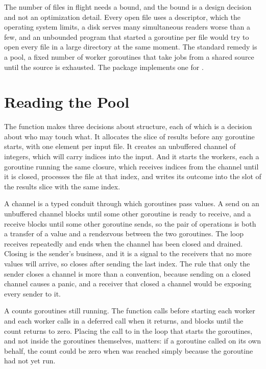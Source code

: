 The number of files in flight needs a bound, and the bound is a design decision and not an optimization detail. Every open file uses a descriptor, which the operating system limits, a disk serves many simultaneous readers worse than a few, and an unbounded program that started a goroutine per file would try to open every file in a large directory at the same moment. The standard remedy is a pool, a fixed number of worker goroutines that take jobs from a shared source until the source is exhausted. The package  implements one for \golab{}.


\section{Reading the Pool}

The function  makes three decisions about structure, each of which is a decision about who may touch what. It allocates the slice of results before any goroutine starts, with one element per input file. It creates an unbuffered channel  of integers, which will carry indices into the input. And it starts the workers, each a goroutine running the same closure, which receives indices from the channel until it is closed, processes the file at that index, and writes its outcome into the slot of the results slice with the same index.

A channel is a typed conduit through which goroutines pass values. A send on an unbuffered channel blocks until some other goroutine is ready to receive, and a receive blocks until some other goroutine sends, so the pair of operations is both a transfer of a value and a rendezvous between the two goroutines. The loop  receives repeatedly and ends when the channel has been closed and drained. Closing is the sender's business, and it is a signal to the receivers that no more values will arrive, so  closes  after sending the last index. The rule that only the sender closes a channel is more than a convention, because sending on a closed channel causes a panic, and a receiver that closed a channel would be exposing every sender to it.

A  counts goroutines still running. The function calls  before starting each worker and each worker calls  in a deferred call when it returns, and  blocks until the count returns to zero. Placing the call to  in the loop that starts the goroutines, and not inside the goroutines themselves, matters: if a goroutine called  on its own behalf, the count could be zero when  was reached simply because the goroutine had not yet run.

